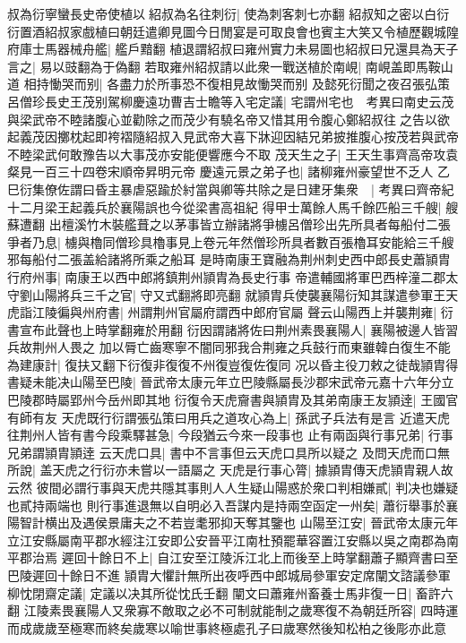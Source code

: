 叔為衍寧蠻長史帝使植以紹叔為名往刺衍|{
	使為刺客刺七亦翻}
紹叔知之密以白衍衍置酒紹叔家戲植曰朝廷遣卿見圖今日閒宴是可取良會也賓主大笑又令植歷觀城隍府庫士馬器械舟艦|{
	艦戶黯翻}
植退謂紹叔曰雍州實力未易圖也紹叔曰兄還具為天子言之|{
	易以豉翻為于偽翻}
若取雍州紹叔請以此衆一戰送植於南峴|{
	南峴盖即馬鞍山道}
相持慟哭而别|{
	各盡力於所事恐不復相見故慟哭而别}
及懿死衍聞之夜召張弘策呂僧珍長史王茂别駕柳慶遠功曹吉士瞻等入宅定議|{
	宅謂州宅也　考異曰南史云茂與梁武帝不睦諸腹心並勸除之而茂少有驍名帝又惜其用令腹心鄭紹叔往之告以欲起義茂因擲枕起即袴褶隨紹叔入見武帝大喜下牀迎因結兄弟披推腹心按茂若與武帝不睦梁武何敢豫告以大事茂亦安能便響應今不取}
茂天生之子|{
	王天生事齊高帝攻袁粲見一百三十四卷宋順帝昇明元帝}
慶遠元景之弟子也|{
	諸柳雍州豪望世不乏人}
乙巳衍集僚佐謂曰昏主暴虐惡踰於紂當與卿等共除之是日建牙集衆　|{
	考異曰齊帝紀十二月梁王起義兵於襄陽誤也今從梁書高祖紀}
得甲士萬餘人馬千餘匹船三千艘|{
	艘蘇遭翻}
出檀溪竹木裝艦葺之以茅事皆立辦諸將爭㯭呂僧珍出先所具者每船付二張爭者乃息|{
	㯭與櫓同僧珍具櫓事見上卷元年然僧珍所具者數百張櫓耳安能給三千艘邪每船付二張盖給諸將所乘之船耳}
是時南康王寶融為荆州刺史西中郎長史蕭頴胄行府州事|{
	南康王以西中郎將鎮荆州頴胄為長史行事}
帝遣輔國將軍巴西梓潼二郡太守劉山陽將兵三千之官|{
	守又式翻將即亮翻}
就頴胄兵使襲襄陽衍知其謀遣參軍王天虎詣江陵徧與州府書|{
	州謂荆州官屬府謂西中郎府官屬}
聲云山陽西上并襲荆雍|{
	衍書宣布此聲也上時掌翻雍於用翻}
衍因謂諸將佐曰荆州素畏襄陽人|{
	襄陽被邊人皆習兵故荆州人畏之}
加以脣亡齒寒寧不闇同邪我合荆雍之兵鼓行而東雖韓白復生不能為建康計|{
	復扶又翻下衍復非復復不州復豈復佐復同}
况以昏主役刀敕之徒哉頴胄得書疑未能决山陽至巴陵|{
	晉武帝太康元年立巴陵縣屬長沙郡宋武帝元嘉十六年分立巴陵郡時屬郢州今岳州即其地}
衍復令天虎齎書與頴胄及其弟南康王友頴逹|{
	王國官有師有友}
天虎既行衍謂張弘策曰用兵之道攻心為上|{
	孫武子兵法有是言}
近遣天虎往荆州人皆有書今段乘驛甚急|{
	今段猶云今來一段事也}
止有兩函與行事兄弟|{
	行事兄弟謂頴胄頴逹}
云天虎口具|{
	書中不言事但云天虎口具所以疑之}
及問天虎而口無所說|{
	盖天虎之行衍亦未嘗以一語屬之}
天虎是行事心膂|{
	據頴胄傳天虎頴胄親人故云然}
彼間必謂行事與天虎共隱其事則人人生疑山陽惑於衆口判相嫌貳|{
	判决也嫌疑也貳持兩端也}
則行事進退無以自明必入吾謀内是持兩空函定一州矣|{
	蕭衍舉事於襄陽智計横出及遇侯景庸夫之不若豈耄邪抑天奪其鑒也}
山陽至江安|{
	晉武帝太康元年立江安縣屬南平郡水經注江安即公安晉平江南杜預罷華容置江安縣以吳之南郡為南平郡治焉}
遲回十餘日不上|{
	自江安至江陵泝江北上而後至上時掌翻蕭子顯齊書曰至巴陵遲回十餘日不進}
頴胄大懼計無所出夜呼西中郎城局參軍安定席闡文諮議參軍柳忱閉齋定議|{
	定議以决其所從忱氏壬翻}
闡文曰蕭雍州畜養士馬非復一日|{
	畜許六翻}
江陵素畏襄陽人又衆寡不敵取之必不可制就能制之歲寒復不為朝廷所容|{
	四時運而成歲歲至極寒而終矣歲寒以喻世事終極處孔子曰歲寒然後知松柏之後彫亦此意}

